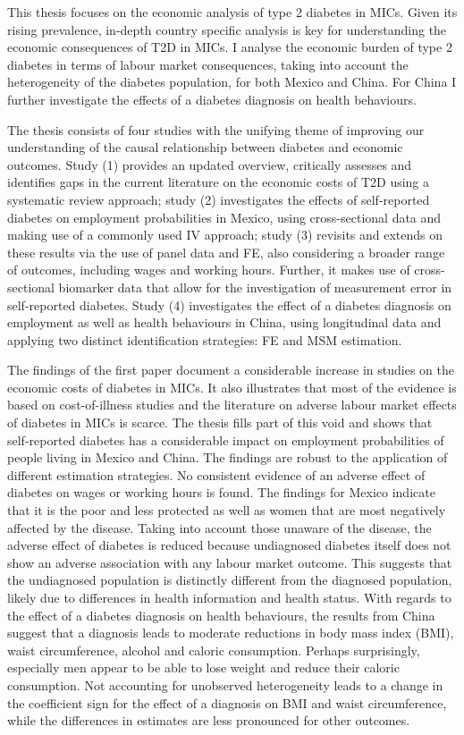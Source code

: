 This thesis focuses on the economic analysis of type 2 diabetes in \acfp{MIC}. Given its rising prevalence, in-depth country specific analysis is key for understanding the economic consequences of T2D in \acp{MIC}. I analyse the economic burden of type 2 diabetes in terms of labour market consequences, taking into account the heterogeneity of the diabetes population, for both Mexico and China. For China I further investigate the effects of a diabetes diagnosis on health behaviours.

The thesis consists of four studies with the unifying theme of improving our understanding of the causal relationship between diabetes and economic outcomes. Study (1) provides an updated overview, critically assesses and identifies gaps in the current literature on the economic costs of T2D using a systematic review approach; study (2) investigates the effects of self-reported diabetes on employment probabilities in Mexico, using cross-sectional data and making use of a commonly used \acf{IV} approach; study (3) revisits and extends on these results via the use of panel data and \acf{FE}, also considering a broader range of outcomes, including wages and working hours. Further, it makes use of cross-sectional biomarker data that allow for the investigation of measurement error in self-reported diabetes. Study (4) investigates the effect of a diabetes diagnosis on employment as well as health behaviours in China, using longitudinal data and applying two distinct identification strategies: \ac{FE} and \acf{MSM} estimation.

The findings of the first paper document a considerable increase in studies on the economic costs of diabetes in \acp{MIC}. It also illustrates that most of the evidence is based on cost-of-illness studies and the literature on adverse labour market effects of diabetes in \acp{MIC} is scarce. The thesis fills part of this void and shows that self-reported diabetes has a considerable impact on employment probabilities of people living in Mexico and China. The findings are robust to the application of different estimation strategies. No consistent evidence of an adverse effect of diabetes on wages or working hours is found. The findings for Mexico indicate that it is the poor and less protected as well as women that are most negatively affected by the disease. Taking into account those unaware of the disease, the adverse effect of diabetes is reduced because undiagnosed diabetes itself does not show an adverse association with any labour market outcome. This suggests that the undiagnosed population is distinctly different from the diagnosed population, likely due to differences in health information and health status. With regards to the effect of a diabetes diagnosis on health behaviours, the results from China suggest that a diagnosis leads to moderate reductions in body mass index (BMI), waist circumference, alcohol and caloric consumption. Perhaps surprisingly, especially men appear to be able to lose weight and reduce their caloric consumption. Not accounting for unobserved heterogeneity leads to a change in the coefficient sign for the effect of a diagnosis on \ac{BMI} and waist circumference, while the differences in estimates are less pronounced for other outcomes.

